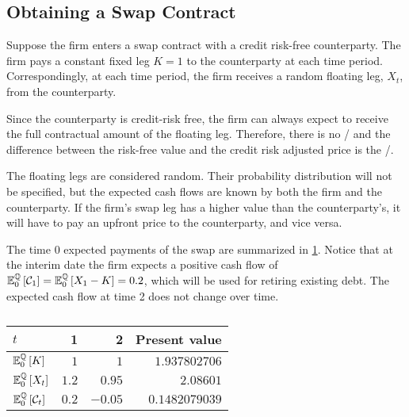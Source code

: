 \documentclass[main.tex]{subfiles}
\begin{document}
    \subsection{Obtaining a Swap Contract}
        Suppose the firm enters a swap contract with a credit risk-free counterparty.
        The firm pays a constant fixed leg $K=\num{1}$ to the counterparty at each time period.
        Correspondingly, at each time period,
        the firm receives a random floating leg, $X_t$, from the counterparty.

        Since the counterparty is credit-risk free,
        the firm can always expect to receive the full contractual amount of the floating leg.
        Therefore, there is no \CVA/ and
        the difference between the risk-free value and the credit risk adjusted price is the \DVA/.

        The floating legs are considered random.
        Their probability distribution will not be specified,
        but the expected cash flows are known
        by both the firm and the counterparty.
        If the firm's swap leg has a higher value than the counterparty's,
        it will have to pay an upfront price to the counterparty,
        and vice versa.

        The time 0 expected payments of the swap are summarized in \cref{tbl:swap-legs}.
        Notice that at the interim date the firm expects a positive cash flow of
        $\mathbb{E}_{0}^{\mathbb{Q}}\left[\mathcal{C}_1\right] = \mathbb{E}_{0}^{\mathbb{Q}}\left[X_1 - K\right] = \num{0.2}$,
        which will be used for retiring existing debt.
        The expected cash flow at time 2 does not change over time.

        \begin{table}[H]
            \centering
            \begin{tabular}{l|rr||r}
                $t$ & 1 & 2 & Present value \\
                \hline
                \rule{0pt}{1.1em}
                $\mathbb{E}_{0}^{\mathbb{Q}}\left[K\right]$ & $\num{1}$ & $\num{1}$ & $\num{1.937802706}$ \\
                \rule{0pt}{1.1em}
                $\mathbb{E}_{0}^{\mathbb{Q}}\left[X_t\right]$ & $\num{1.2}$ & $\num{0.95}$ & $\num{2.08601}$ \\
                \rule{0pt}{1.1em}
                $\mathbb{E}_{0}^{\mathbb{Q}}\left[\mathcal{C}_t\right]$ & $\num{0.2}$ & $\num{-0.05}$ & $\num{0.1482079039}$ \\
            \end{tabular}
            \caption{}
            \label{tbl:swap-legs}
        \end{table}
\end{document}
